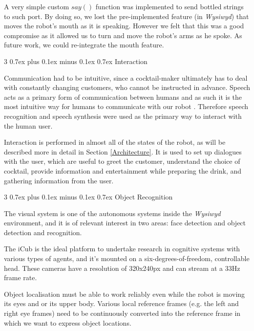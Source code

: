 \documentclass[conference]{IEEEtran}
\makeatletter
\def\subsubsection{\@startsection{subsubsection}%
	{3}%
	{\z@}%
	{0.7ex plus 0.1ex minus 0.1ex}%
	{0.7ex}%
	{\normalfont\normalsize\itshape}}%
\makeatother
\begin{document}
A very simple custom $say()$ function was implemented to send bottled strings to such port. By doing so, we lost the pre-implemented feature (in \textit{Wysiwyd}) that moves the robot's mouth as it is speaking. However we felt that this was a good compromise as it allowed us to turn and move the robot's arms as he spoke. As future work, we could re-integrate the mouth feature. 

\subsubsection{Interaction} 

Communication had to be intuitive, since a cocktail-maker ultimately has to deal with constantly changing customers, who cannot be instructed in advance. Speech acts as a primary form of communication between humans and as such it is the most intuitive way for humans to communicate with our robot \cite{RobotsMeetHumans}. Therefore speech recognition and speech synthesis were used as the primary way to interact with the human user.

Interaction is performed in almost all of the states of the robot, as will be described more in detail in Section \ref{Architecture}. It is used to set up dialogues with the user, which are useful to greet the customer, understand the choice of cocktail, provide information and entertainment while preparing the drink, and gathering information from the user. 

\subsubsection{Object Recognition}

The visual system is one of the autonomous systems inside the \textit{Wysiwyd} environment, and it is of relevant interest in two areas: face detection and object detection and recognition.

The iCub is the ideal platform to undertake research in cognitive systems with various types of agents, and it's mounted on a six-degrees-of-freedom, controllable head. These cameras have a resolution of 320x240px and can stream at a 33Hz frame rate. 

Object localisation must be able to work reliably even while the robot is moving its eyes and or its upper body. Various local reference frames (e.g. 
the left and right eye frames) need to be continuously converted into the reference frame in which we want to express object locations. 
\end{document}
